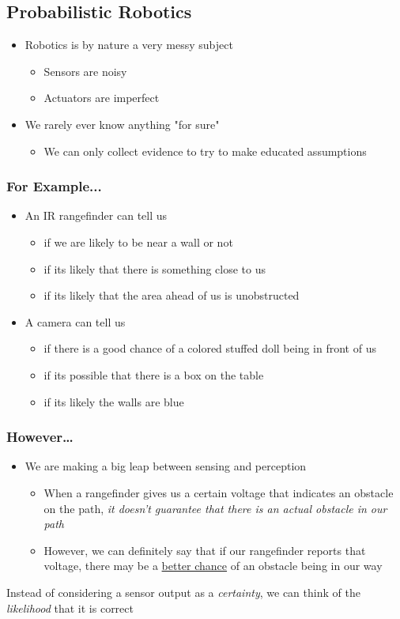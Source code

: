 \documentclass[10pt]{article}
\begin{document}
\subsection*{Probabilistic Robotics}
\begin{itemize}
	\item Robotics is by nature a very messy subject
	\begin{itemize}
        \item Sensors are noisy
        \item Actuators are imperfect
    \end{itemize}
	\item We rarely ever know anything "for sure"
	\begin{itemize}
        \item We can only collect evidence to try to make educated assumptions
    \end{itemize}
\end{itemize}
\subsubsection*{For Example...}
\begin{itemize}
	\item An IR rangefinder can tell us
	\begin{itemize}
        \item if we are likely to be near a wall or not
        \item if its likely that there is something close to us
        \item if its likely that the area ahead of us is unobstructed
    \end{itemize}
    \item A camera can tell us
    \begin{itemize}
        \item if there is a good chance of a colored stuffed doll being in front of us
        \item if its possible that there is a box on the table
        \item if its likely the walls are blue
    \end{itemize}
\end{itemize}
\subsubsection*{However\dots}
\begin{itemize}
	\item We are making a big leap between sensing and perception
	\begin{itemize}
        \item When a rangefinder gives us a certain voltage that indicates an obstacle on the path, \textit{it doesn't guarantee that there is an actual obstacle in our path}
        \item However, we can definitely say that if our rangefinder reports that voltage, there may be a \underline{better chance} of an obstacle being in our way
    \end{itemize}
\end{itemize}
Instead of considering a sensor output as a \textit{certainty}, we can think of the \textit{likelihood} that it is correct
\end{document}

